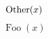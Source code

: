 \documentclass{article}
\begin{document}
\begin{equation}\foo(x)\end{equation}
\DeclareMathOperator{\foo}{Foo}
\DeclareMathOperator{\foo}{Other}
\DeclareMathOperator*{\barop}{Bar}
\begin{equation}\foo(x)\end{equation}
\end{document}
